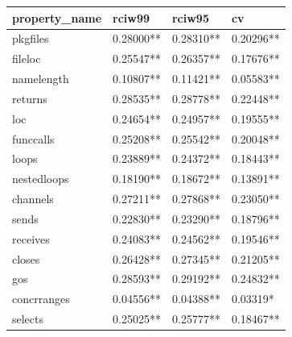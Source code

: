 \documentclass{seal_thesis}
\begin{document}
\begin{table}[H]
	\begin{tabular}{@{}llll@{}}
		property\_name & rciw99 & rciw95 & cv \\
		\toprule
		pkgfiles & \cellcolor[HTML]{FFCC99}0.28000** & \cellcolor[HTML]{FFCC99}0.28310** & \cellcolor[HTML]{99CCFF}0.20296** \\
		fileloc & \cellcolor[HTML]{FFCC99}0.25547** & \cellcolor[HTML]{FFCC99}0.26357** & \cellcolor[HTML]{99CCFF}0.17676** \\
		namelength & \cellcolor[HTML]{99CCFF}0.10807** & \cellcolor[HTML]{99CCFF}0.11421** & \cellcolor[HTML]{3366FF}0.05583** \\
		returns & \cellcolor[HTML]{FFCC99}0.28535** & \cellcolor[HTML]{FFCC99}0.28778** & \cellcolor[HTML]{C0C0C0}0.22448** \\
		loc & \cellcolor[HTML]{C0C0C0}0.24654** & \cellcolor[HTML]{C0C0C0}0.24957** & \cellcolor[HTML]{99CCFF}0.19555** \\
		funccalls & \cellcolor[HTML]{C0C0C0}0.25208** & \cellcolor[HTML]{FFCC99}0.25542** & \cellcolor[HTML]{99CCFF}0.20048** \\
		loops & \cellcolor[HTML]{C0C0C0}0.23889** & \cellcolor[HTML]{C0C0C0}0.24372** & \cellcolor[HTML]{99CCFF}0.18443** \\
		nestedloops & \cellcolor[HTML]{99CCFF}0.18190** & \cellcolor[HTML]{99CCFF}0.18672** & \cellcolor[HTML]{99CCFF}0.13891** \\
		channels & \cellcolor[HTML]{FFCC99}0.27211** & \cellcolor[HTML]{FFCC99}0.27868** & \cellcolor[HTML]{C0C0C0}0.23050** \\
		sends & \cellcolor[HTML]{C0C0C0}0.22830** & \cellcolor[HTML]{C0C0C0}0.23290** & \cellcolor[HTML]{99CCFF}0.18796** \\
		receives & \cellcolor[HTML]{C0C0C0}0.24083** & \cellcolor[HTML]{C0C0C0}0.24562** & \cellcolor[HTML]{99CCFF}0.19546** \\
		closes & \cellcolor[HTML]{FFCC99}0.26428** & \cellcolor[HTML]{FFCC99}0.27345** & \cellcolor[HTML]{99CCFF}0.21205** \\
		gos & \cellcolor[HTML]{FFCC99}0.28593** & \cellcolor[HTML]{FFCC99}0.29192** & \cellcolor[HTML]{C0C0C0}0.24832** \\
		concrranges & \cellcolor[HTML]{3366FF}0.04556** & \cellcolor[HTML]{3366FF}0.04388** & \cellcolor[HTML]{3366FF}0.03319* \\
		selects & \cellcolor[HTML]{C0C0C0}0.25025** & \cellcolor[HTML]{FFCC99}0.25777** & \cellcolor[HTML]{99CCFF}0.18467** \\

\end{tabular}
\end{table}
\end{document}

